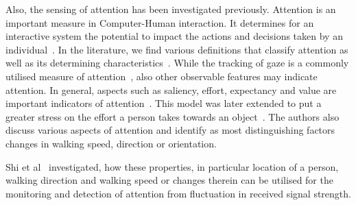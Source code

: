 \documentclass[12pt]{article}
\makeatletter
\renewcommand\paragraph{\@startsection{paragraph}{4}{\z@}%
  {-3.25ex\@plus -1ex \@minus -.2ex}%
  {1.5ex \@plus .2ex}%
  {\normalfont\normalsize\bfseries}}
\makeatother
\begin{document}
Also, the sensing of attention has been investigated previously. 
Attention is an important measure in Computer-Human interaction. 
It determines for an interactive system the potential to impact the actions and decisions taken by an individual~\cite{AttentionMonitoring_Xu_2012}.
In the literature, we find various definitions that classify attention as well as its determining characteristics~\cite{AttentionMonitoring_Wu_2007, AttentionMonitoring_Wickens_1984}.
While the tracking of gaze is a commonly utilised measure of attention~\cite{AttentionMonitoring_Yonezawa_2007}, also other observable features may indicate attention. 
In general, aspects such as saliency, effort, expectancy and value are important indicators of attention~\cite{AttentionMonitoring_Wickens_2008, AttentionMonitoring_Wickens_1984,AttentionMonitoring_Xu_2012,AttentionMonitoring_Gollan_2011}.
This model was later extended to put a greater stress on the effort a person takes towards an object~\cite{AttentionMonitoring_Ferscha_2012}.
The authors also discuss various aspects of attention and identify as most distinguishing factors changes in walking speed, direction or orientation.

Shi et al~\cite{Pervasive_Shi_2014} investigated, how these properties, in particular location of a person, walking direction and walking speed or changes therein can be utilised for the monitoring and detection of attention from fluctuation in received signal strength. 
\end{document}
